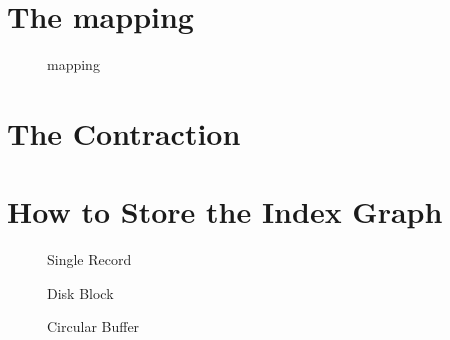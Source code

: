 \section{The mapping}

\begin{figure}
    \centering
    
    \caption{mapping}
    \label{fig:mapping}
\end{figure}

\section{The Contraction}

\section{How to Store the Index Graph}

\begin{figure}
    \centering
    
    \caption{Single Record}
    \label{fig:singleRecord}
\end{figure}

\begin{figure}
    \centering
    
    \caption{Disk Block}
    \label{fig:disk_block}
\end{figure}

\begin{figure}
    \centering
    
    \caption{Circular Buffer}
    \label{fig:circular_buffer}
\end{figure}
